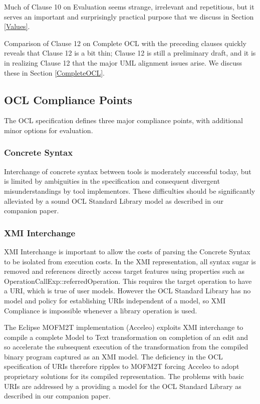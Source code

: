 \documentclass{eceasst}
\begin{document}
Much of Clause 10 on Evaluation seems strange, irrelevant and repetitious, but it serves an important and surprisingly practical purpose that we discuss in Section \ref{Values}.

Comparison of Clause 12 on Complete OCL with the preceding clauses quickly reveals that Clause 12 is a bit thin; Clause 12 is still a preliminary draft, and it is in realizing Clause 12 that the major UML alignment issues arise. We discuss these in Section \ref{CompleteOCL}.
 
\subsection{OCL Compliance Points}

The OCL specification defines three major compliance points, with additional minor options for evaluation.

\subsubsection{Concrete Syntax}

Interchange of concrete syntax between tools is moderately successful today, but is limited by ambiguities in the specification and consequent divergent misunderstandings by tool implementors. These difficulties should be significantly alleviated by a sound OCL Standard Library model as described in our companion paper\cite{OCL-stdlib}.
 
\subsubsection{XMI Interchange}

XMI Interchange is important to allow the costs of parsing the Concrete Syntax to be isolated from execution costs. In the XMI representation, all syntax sugar is removed and references directly access target features using properties such as OperationCallExp::referredOperation. This requires the target operation to have a URI, which is true of user models. However the OCL Standard Library has no model and policy for establishing URIs independent of a model, so XMI Compliance is impossible whenever a library operation is used.

The Eclipse MOFM2T\cite{MOFM2T} implementation (Acceleo\cite{M2T/Acceleo}) exploits XMI interchange to compile a complete Model to Text transformation on completion of an edit and so accelerate the subsequent execution of the transformation from the compiled binary program captured as an XMI model. The deficiency in the OCL specification of URIs therefore ripples to MOFM2T forcing Acceleo to adopt proprietary solutions for its compiled representation. The problems with basic URIs are addressed by a providing a model for the OCL Standard Library as described in our companion paper\cite{OCL-stdlib}.
\end{document}
